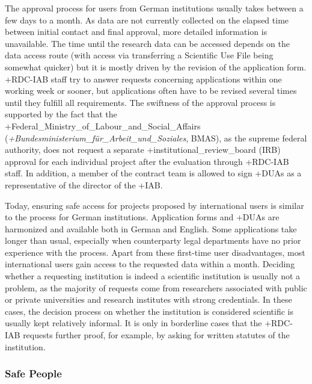 \documentclass[
]{WileySix}
\begin{document}
The approval process for users from German institutions usually takes between a few days to a month. As data are not currently collected on the elapsed time between initial contact and final approval, more detailed information is unavailable. The time until the research data can be accessed depends on the data access route (with access via transferring a Scientific Use File being somewhat quicker) but it is mostly driven by the revision of the application form. +RDC-IAB\textbar{} staff try to answer requests concerning applications within one working week or sooner, but applications often have to be revised several times until they fulfill all requirements. The swiftness of the approval process is supported by the fact that the +Federal\_Ministry\_of\_Labour\_and\_Social\_Affairs\textbar{} (\emph{+Bundesministerium\_für\_Arbeit\_und\_Soziales\textbar{}}, BMAS), as the supreme federal authority, does not request a separate +institutional\_review\_board\textbar{} (IRB) approval for each individual project after the evaluation through +RDC-IAB\textbar{} staff. In addition, a member of the contract team is allowed to sign +DUA\textbar s as a representative of the director of the +IAB\textbar.

Today, ensuring safe access for projects proposed by international users is similar to the process for German institutions. Application forms and +DUA\textbar s are harmonized and available both in German and English. Some applications take longer than usual, especially when counterparty legal departments have no prior experience with the process. Apart from these first-time user disadvantages, most international users gain access to the requested data within a month. Deciding whether a requesting institution is indeed a scientific institution is usually not a problem, as the majority of requests come from researchers associated with public or private universities and research institutes with strong credentials. In these cases, the decision process on whether the institution is considered scientific is usually kept relatively informal. It is only in borderline cases that the +RDC-IAB\textbar{} requests further proof, for example, by asking for written statutes of the institution.

\hypertarget{safe-people}{%
\subsubsection{Safe People}\label{safe-people}}
\end{document}
